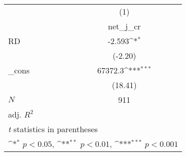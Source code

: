 {
\def\sym#1{\ifmmode^{#1}\else\(^{#1}\)\fi}
\begin{tabular}{l*{1}{c}}
\toprule
            &\multicolumn{1}{c}{(1)}\\
            &\multicolumn{1}{c}{net\_j\_cr}\\
\midrule
RD          &      -2.593\sym{*}  \\
            &     (-2.20)         \\
\addlinespace
\_cons      &     67372.3\sym{***}\\
            &     (18.41)         \\
\midrule
\(N\)       &         911         \\
adj. \(R^{2}\)&                     \\
\bottomrule
\multicolumn{2}{l}{\footnotesize \textit{t} statistics in parentheses}\\
\multicolumn{2}{l}{\footnotesize \sym{*} \(p<0.05\), \sym{**} \(p<0.01\), \sym{***} \(p<0.001\)}\\
\end{tabular}
}
